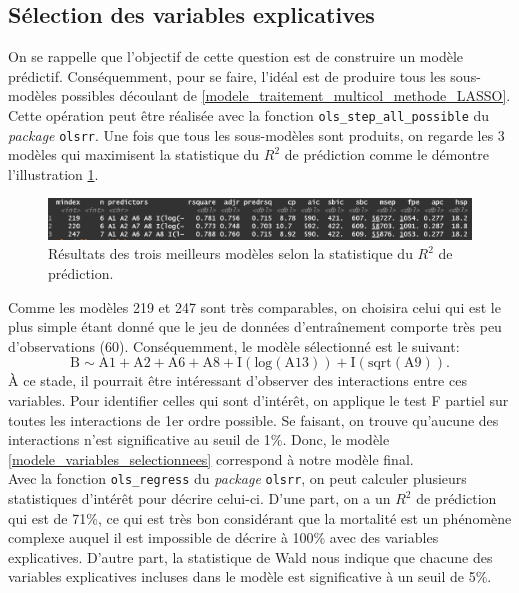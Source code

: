 \documentclass{article}
\begin{document}
	\subsection{Sélection des variables explicatives}
	On se rappelle que l'objectif de cette question est de construire un modèle prédictif. Conséquemment, pour se faire, l'idéal est de produire tous les sous-modèles possibles découlant de \eqref{modele_traitement_multicol_methode_LASSO}.
	Cette opération peut être réalisée avec la fonction \texttt{ols\_step\_all\_possible} du \textit{package} \texttt{olsrr}. Une fois que tous les sous-modèles sont produits, on regarde les 3 modèles qui maximisent la statistique du $R^2$ de prédiction comme le démontre l'illustration \ref{Qst1_all_possible_models_top3}.
	\begin{figure}[H]
		\centering
		\includegraphics[width=\textwidth]{graphiques/Qst1_all_possible_models_top3}
		\caption{Résultats des trois meilleurs modèles selon la statistique du $R^2$ de prédiction.}
		\label{Qst1_all_possible_models_top3}
	\end{figure}
	Comme les modèles 219 et 247 sont très comparables, on choisira celui qui est le plus simple étant donné que le jeu de données d'entraînement comporte très peu d'observations (60). Conséquemment, le modèle sélectionné est le suivant:
	\begin{equation}\label{modele_variables_selectionnees}
		\mathrm{B} \sim \mathrm{A1 + A2 + A6 + A8 + I(log(A13)) + I(sqrt(A9))}.
	\end{equation}
	À ce stade, il pourrait être intéressant d'observer des interactions entre ces variables. Pour identifier celles qui sont d'intérêt, on applique le test F partiel sur toutes les interactions de 1er ordre possible. Se faisant, on trouve qu'aucune des interactions n'est significative au seuil de 1\%. Donc, le modèle \eqref{modele_variables_selectionnees} correspond à notre modèle final.\\
	
	Avec la fonction \texttt{ols\_regress} du \textit{package} \texttt{olsrr}, on peut calculer plusieurs statistiques d'intérêt pour décrire celui-ci. D'une part, on a un $R^2$ de prédiction qui est de 71\%, ce qui est très bon considérant que la mortalité est un phénomène complexe auquel il est impossible de décrire à 100\% avec des variables explicatives. D'autre part, la statistique de Wald nous indique que chacune des variables explicatives incluses dans le modèle est significative à un seuil de 5\%.
	
\end{document}
